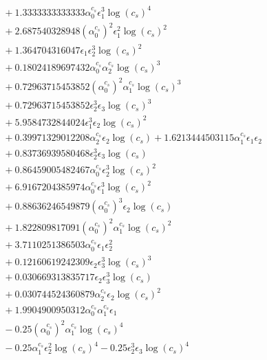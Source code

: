 \documentclass[10pt]{article}
\begin{document}
\begin{align*}
&{}  + 1.3333333333333 \alpha_{0}^{c_s} \epsilon_{1}^{3} \log{\left(c_{s} \right)}^{4} \\
&{}  + 2.687540328948 \left(\alpha_{0}^{c_s}\right)^{2} \epsilon_{1}^{2} \log{\left(c_{s} \right)}^{2} \\
&{}  + 1.364704316047 \epsilon_{1} \epsilon_{2}^{3} \log{\left(c_{s} \right)}^{2} \\
&{}  + 0.18024189697432 \alpha_{0}^{c_s} \alpha_{2}^{c_s} \log{\left(c_{s} \right)}^{3} \\
&{}  + 0.72963715453852 \left(\alpha_{0}^{c_s}\right)^{2} \alpha_{1}^{c_s} \log{\left(c_{s} \right)}^{3} \\
&{}  + 0.72963715453852 \epsilon_{2}^{3} \epsilon_{3} \log{\left(c_{s} \right)}^{3} \\
&{}  + 5.9584732844024 \epsilon_{1}^{3} \epsilon_{2} \log{\left(c_{s} \right)}^{2} \\
&{}  + 0.39971329012208 \alpha_{2}^{c_s} \epsilon_{2} \log{\left(c_{s} \right)} + 1.6213444503115 \alpha_{1}^{c_s} \epsilon_{1} \epsilon_{2} \\
&{}  + 0.83736939580468 \epsilon_{2}^{3} \epsilon_{3} \log{\left(c_{s} \right)} \\
&{}  + 0.86459005482467 \alpha_{0}^{c_s} \epsilon_{2}^{3} \log{\left(c_{s} \right)}^{2} \\
&{}  + 6.9167204385974 \alpha_{0}^{c_s} \epsilon_{1}^{3} \log{\left(c_{s} \right)}^{2} \\
&{}  + 0.88636246549879 \left(\alpha_{0}^{c_s}\right)^{3} \epsilon_{2} \log{\left(c_{s} \right)} \\
&{}  + 1.822809817091 \left(\alpha_{0}^{c_s}\right)^{2} \alpha_{1}^{c_s} \log{\left(c_{s} \right)}^{2} \\
&{}  + 3.7110251386503 \alpha_{0}^{c_s} \epsilon_{1} \epsilon_{2}^{2} \\
&{}  + 0.12160619242309 \epsilon_{2} \epsilon_{3}^{3} \log{\left(c_{s} \right)}^{3} \\
&{}  + 0.030669313835717 \epsilon_{2} \epsilon_{3}^{3} \log{\left(c_{s} \right)} \\
&{}  + 0.030744524360879 \alpha_{2}^{c_s} \epsilon_{2} \log{\left(c_{s} \right)}^{2} \\
&{}  + 1.9904900950312 \alpha_{0}^{c_s} \alpha_{1}^{c_s} \epsilon_{1} \\
&{}  - 0.25 \left(\alpha_{0}^{c_s}\right)^{2} \alpha_{1}^{c_s} \log{\left(c_{s} \right)}^{4} \\
&{}  - 0.25 \alpha_{1}^{c_s} \epsilon_{2}^{2} \log{\left(c_{s} \right)}^{4} - 0.25 \epsilon_{2}^{3} \epsilon_{3} \log{\left(c_{s} \right)}^{4} \\

\end{align*}
\end{document}
